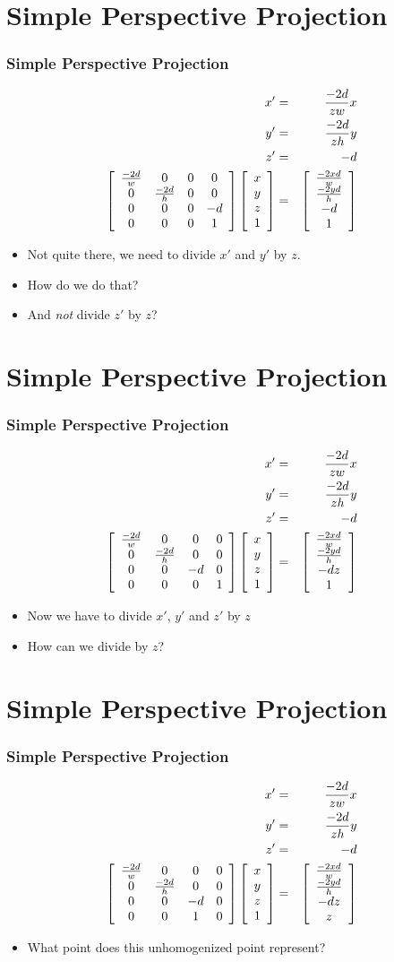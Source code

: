 \documentclass[slidestop,xcolor=pst]{beamer}
\newcommand{\sect}[1]{
\section{#1}
\begin{frame}[fragile]\frametitle{#1}
}
\begin{document}
\sect{Simple Perspective Projection}
\begin{eqnarray*}
x' &=&  \frac{-2d}{zw}x\\
y' &=& \frac{-2d}{zh}y\\
z' &=&  -d\\
\left[\begin{array}{cccc} \frac{-2d}{w}&0&0&0 \\ 0&\frac{-2d}{h}&0&0 \\ 0&0&0&-d \\0&0&0&1\end{array}\right] \left[\begin{array}{c} x\\y\\z \\ 1\end{array}\right]
  &=&\left[\begin{array}{c} \frac{-2xd}{w}\\\frac{-2yd}{h}\\-d \\ 1\end{array}\right]
\end{eqnarray*}
\begin{itemize}
\item Not quite there, we need to divide $x'$ and $y'$ by $z$.
\item How do we do that?
\item And {\em not} divide $z'$ by $z$?
\end{itemize}
\end{frame}

\sect{Simple Perspective Projection}
\begin{eqnarray*}
x' &=&  \frac{-2d}{zw}x\\
y' &=& \frac{-2d}{zh}y\\
z' &=&  -d\\
\left[\begin{array}{cccc} \frac{-2d}{w}&0&0&0 \\ 0&\frac{-2d}{h}&0&0 \\ 0&0&-d&0 \\0&0&0&1\end{array}\right] \left[\begin{array}{c} x\\y\\z \\ 1\end{array}\right]
  &=&\left[\begin{array}{c} \frac{-2xd}{w}\\\frac{-2yd}{h}\\-dz \\ 1\end{array}\right]
\end{eqnarray*}
\begin{itemize}
\item Now we have to divide $x'$, $y'$ and $z'$ by $z$
\item How can we divide  by $z$?
\end{itemize}
\end{frame}

\sect{Simple Perspective Projection}
\begin{eqnarray*}
x' &=&  \frac{-2d}{zw}x\\
y' &=& \frac{-2d}{zh}y\\
z' &=&  -d\\
\left[\begin{array}{cccc} \frac{-2d}{w}&0&0&0 \\ 0&\frac{-2d}{h}&0&0 \\ 0&0&-d&0 \\ 0&0&1&0\end{array}\right] \left[\begin{array}{c} x\\y\\z \\ 1\end{array}\right]
  &=&\left[\begin{array}{c} \frac{-2xd}{w}\\\frac{-2yd}{h}\\-dz\\z \end{array}\right]
\end{eqnarray*}
\begin{itemize}
\item What point does this unhomogenized point represent?
\end{itemize}
\end{frame}
\end{document}
